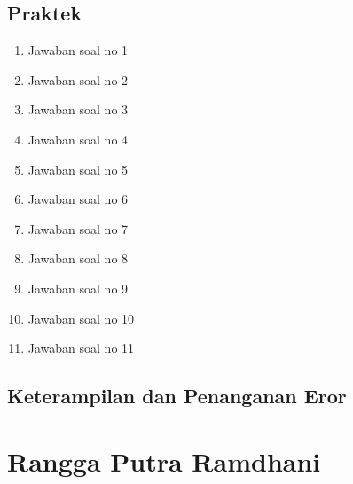 \subsection{Praktek}
\begin{enumerate}
	\item Jawaban soal no 1
	
	\item Jawaban soal no 2
	
	\item Jawaban soal no 3
	
	\item Jawaban soal no 4
	
	\item Jawaban soal no 5
	
	\item Jawaban soal no 6
	
	\item Jawaban soal no 7
	
	\item Jawaban soal no 8
	
	\item Jawaban soal no 9
	
	\item Jawaban soal no 10
	
	\item Jawaban soal no 11
	
\end{enumerate}

\subsection{Keterampilan dan Penanganan Eror}
	

\section{Rangga Putra Ramdhani}
